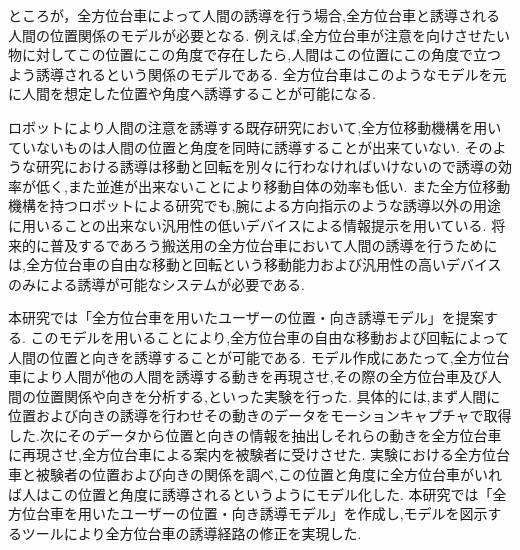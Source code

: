 \begin{comment}
\begin{figure}[!h]
\begin{center}

\texttt{[image: Alpha.eps]}
\caption{Alphaの画像}
\label{Alpha}
\end{center}
\end{figure}
\end{comment}

\begin{comment}
\begin{figure}[!h]
\begin{center}

\texttt{[image: KEITA.eps]}
\caption{KEITAの画像}
\label{KEITA}
\end{center}
\end{figure}
\end{comment}

\par
ところが，全方位台車によって人間の誘導を行う場合,全方位台車と誘導される人間の位置関係のモデルが必要となる.
例えば,全方位台車が注意を向けさせたい物に対してこの位置にこの角度で存在したら,人間はこの位置にこの角度で立つよう誘導されるという関係のモデルである.
全方位台車はこのようなモデルを元に人間を想定した位置や角度へ誘導することが可能になる.
\par
ロボットにより人間の注意を誘導する既存研究において,全方位移動機構を用いていないものは人間の位置と角度を同時に誘導することが出来ていない.
そのような研究における誘導は移動と回転を別々に行わなければいけないので誘導の効率が低く,また並進が出来ないことにより移動自体の効率も低い.
また全方位移動機構を持つロボットによる研究でも,腕による方向指示のような誘導以外の用途に用いることの出来ない汎用性の低いデバイスによる情報提示を用いている.
将来的に普及するであろう搬送用の全方位台車において人間の誘導を行うためには,全方位台車の自由な移動と回転という移動能力および汎用性の高いデバイスのみによる誘導が可能なシステムが必要である.

\par
本研究では「全方位台車を用いたユーザーの位置・向き誘導モデル」を提案する.
このモデルを用いることにより,全方位台車の自由な移動および回転によって人間の位置と向きを誘導することが可能である.
モデル作成にあたって,全方位台車により人間が他の人間を誘導する動きを再現させ,その際の全方位台車及び人間の位置関係や向きを分析する,といった実験を行った.
具体的には,まず人間に位置および向きの誘導を行わせその動きのデータをモーションキャプチャで取得した.次にそのデータから位置と向きの情報を抽出しそれらの動きを全方位台車に再現させ,全方位台車による案内を被験者に受けさせた.
実験における全方位台車と被験者の位置および向きの関係を調べ,この位置と角度に全方位台車がいれば人はこの位置と角度に誘導されるというようにモデル化した.
本研究では「全方位台車を用いたユーザーの位置・向き誘導モデル」を作成し,モデルを図示するツールにより全方位台車の誘導経路の修正を実現した.

